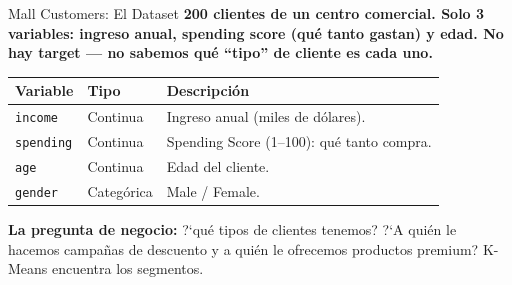\documentclass[aspectratio=169, 11pt]{beamer}
\begin{document}
\begin{frame}{Mall Customers: El Dataset}
  \vspace{-4pt}
  {\footnotesize\color{arcaDark}\bfseries
    200 clientes de un centro comercial. Solo 3 variables:
    \textbf{ingreso anual}, \textbf{spending score} (qu\'e tanto gastan)
    y \textbf{edad}. No hay target --- no sabemos qu\'e ``tipo'' de
    cliente es cada uno.}

  \vspace{6pt}
  {\scriptsize
  \begin{tabular}{@{}llp{7cm}@{}}
    \toprule
    \textbf{Variable} & \textbf{Tipo} & \textbf{Descripci\'on} \\
    \midrule
    \texttt{income} & Continua & Ingreso anual (miles de d\'olares). \\
    \texttt{spending} & Continua & Spending Score (1--100): qu\'e tanto compra. \\
    \texttt{age} & Continua & Edad del cliente. \\
    \texttt{gender} & Categ\'orica & Male / Female. \\
    \bottomrule
  \end{tabular}
  }

  \vspace{6pt}
  \begin{tcolorbox}[colback=arcaGray, colframe=arcaRed, boxrule=0.5pt, arc=2pt,
    left=6pt, right=6pt, top=4pt, bottom=4pt]
    {\scriptsize\color{arcaDark}
    \faKey\hspace{4pt}\textbf{La pregunta de negocio:} ?`qu\'e tipos de clientes
    tenemos? ?`A qui\'en le hacemos campa\~nas de descuento y a qui\'en
    le ofrecemos productos premium? K-Means encuentra los segmentos.}
  \end{tcolorbox}
\end{frame}
\end{document}
